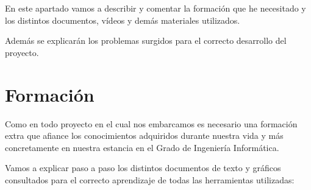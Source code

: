 

En este apartado vamos a describir y comentar la formación que he necesitado y los distintos documentos, vídeos y demás materiales utilizados.

Además se explicarán los problemas surgidos para el correcto desarrollo del proyecto.


\section{Formación}

Como en todo proyecto en el cual nos embarcamos es necesario una formación extra que afiance los conocimientos adquiridos durante nuestra vida y más concretamente en nuestra estancia en el Grado de Ingeniería Informática.

Vamos a explicar paso a paso los distintos documentos de texto y gráficos consultados para el correcto aprendizaje de todas las herramientas utilizadas:

